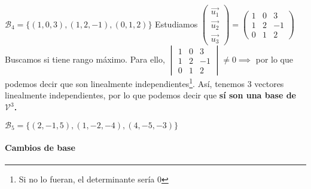\begin{problem}
        
        \spart $\mathcal{B}_4 = \{(1,0,3),(1,2,-1),(0,1,2)\}$
        \subitem Estudiamos $\displaystyle \begin{pmatrix}\vec{u_1}\\\vec{u_2}\\\vec{u_3}\end{pmatrix} = \begin{pmatrix}1&0&3\\1&2&-1\\0&1&2\end{pmatrix}$ 
        Buscamos si tiene rango máximo. Para ello, $\begin{vmatrix}1&0&3\\1&2&-1\\0&1&2\end{vmatrix} \neq 0 \implies $ por lo que podemos decir que son linealmente independientes\footnote{Si no lo fueran, el determinante sería 0}. Así, tenemos 3 vectores linealmente independientes, por lo que podemos decir que \textbf{sí son una base de $\mathcal{V}^3$.}
        
        
        \spart $\mathcal{B}_5 = \{(2,-1,5),(1,-2,-4),(4,-5,-3)\}$
        \subitem {}
    
\end{problem}

\paragraph{Cambios de base}

